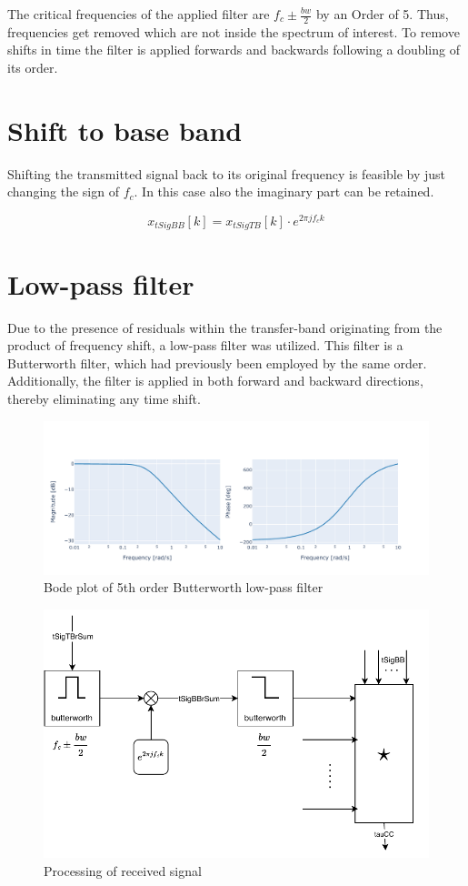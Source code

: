 The critical frequencies of the applied filter are $f_c\pm\frac{bw}{2}$ by an Order of 5. Thus, frequencies get removed which are not inside the spectrum of interest. To remove shifts in time the filter is applied forwards and backwards following a doubling of its order.
\section{Shift to base band}

Shifting the transmitted signal back to its original frequency is feasible by just changing the sign of $f_c$. In this case also the imaginary part can be retained.

\begin{equation}
	x_{tSigBB}[k]=x_{tSigTB}[k]\cdot e^{2\pi j f_c k}
	\label{eq:rshift}
\end{equation}
\section{Low-pass filter}
Due to the presence of residuals within the transfer-band originating from the product of frequency shift, a low-pass filter was utilized. This filter is a Butterworth filter, which had previously been employed by the same order. Additionally, the filter is applied in both forward and backward directions, thereby eliminating any time shift.
\begin{figure}[h]
	\includegraphics[width=\linewidth]{images/bode}
	
	\caption{Bode plot of 5th order Butterworth low-pass filter}
	\label{fig:bode}
\end{figure}
\begin{figure}[h]
	\centering
	\includegraphics[width=\linewidth]{images/recsig}
	\caption{Processing of received signal}
	\label{fig:recsig}
\end{figure}

